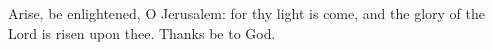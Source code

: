 Arise, be enlightened, O Jerusalem: for thy light is come, and the glory of the Lord is risen upon thee. \rubric{\Rbar\ }Thanks be to God.